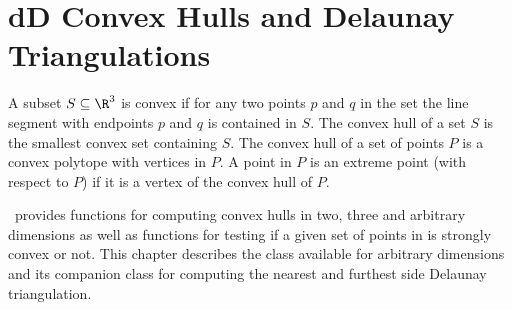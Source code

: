 
\chapter{dD Convex Hulls and Delaunay Triangulations}
\label{chap:convex_hull_d_ref}

A subset $S \subseteq \R^3$ is convex if for any two points $p$ and $q$
in the set the line segment with endpoints $p$ and $q$ is contained
in $S$. The convex hull of a set $S$ is 
the smallest convex set containing
$S$. The convex hull of a set of points $P$ is a convex 
polytope with vertices in $P$.  A point in $P$ is an extreme point 
(with respect to $P$) if it is a vertex 
of the convex hull of $P$.

\cgal\ provides functions for computing convex hulls in two, three 
and arbitrary dimensions as well as functions for testing if a given set of 
points in is strongly convex or not.  This chapter describes the class
available for arbitrary dimensions and its companion class for 
computing the nearest and furthest side Delaunay triangulation. 



 \\
 \\
 \\


 \\
  \\

\clearpage

